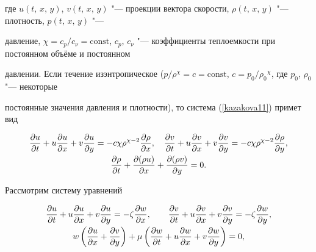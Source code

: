 где $u(t,\,x,\,y)$, $v(t,\,x,\,y)$ "--- проекции вектора скорости, $\rho(t,\,x,\,y)$ "--- плотность, $p(t,\,x,\,y)$ "---

давление, $\chi=c_p/c_\nu=\text{const}$,  $c_p$, $c_\nu$ "--- коэффициенты теплоемкости при постоянном объёме и постоянном

давлении. Если течение изэнтропическое ($p/\rho^\chi=c=\text{const}$, $c=p_0/{\rho_0}^\chi$, где $p_0$, $\rho_0$ "--- некоторые

постоянные значения давления и плотности), то система (\ref{kazakova11}) примет вид

\begin{equation}\label{kazakova12}

\begin{array}{c}

\displaystyle \frac{\partial u}{\partial t}+u\frac{\partial u}{\partial x}+v\frac{\partial u}{\partial y}=- c \chi

{\rho}^{\chi-2}

\frac{\partial {\rho}}{\partial x},\quad 

\displaystyle \frac{\partial v}{\partial t}+u\frac{\partial v}{\partial x}+v\frac{\partial v}{\partial y}=- c \chi \rho^{\chi-2}

\frac{\partial \rho}

{\partial y}, \vspace{1mm} \\

\displaystyle \frac{\partial \rho}{\partial t}+\frac{\partial (\rho u)}{\partial x}+\frac{\partial (\rho v)}{\partial y}=0.

\end{array}

\end{equation}



Рассмотрим систему уравнений

\begin{equation}

\label{kazakova13}

\begin{array}{c}

\displaystyle \frac{\partial u}{\partial t}+u\frac{\partial u}{\partial x} + v \frac{\partial u}{\partial y} = - \zeta \frac{\partial w}{\partial x},\qquad 

\displaystyle \frac{\partial v}{\partial t}+u\frac{\partial v}{\partial x} + v \frac{\partial v}{\partial y}=- \zeta \frac{\partial w}{\partial y},

\vspace{1mm}

\\

\displaystyle w\left(\frac{\partial u}{\partial x}+\frac{\partial v}{\partial y}\right)+\mu \left(\frac{\partial w}{\partial t}+u

\frac{\partial w}{\partial x}+v \frac{\partial w}{\partial y} \right)=0,

\end{array}

\end{equation}

